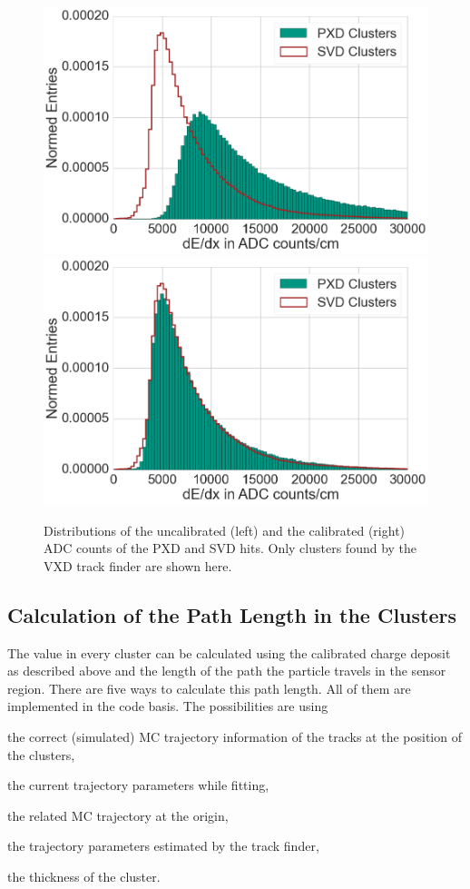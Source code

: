 \begin{figure}
  \centering
 \includegraphics[width=0.48\linewidth]{figures/vxd/dEdXUncalibrated.png}
 \includegraphics[width=0.48\linewidth]{figures/vxd/dEdXCalibrated.png}
 \caption[Distributions of the uncalibrated and the calibrated ADC counts.]{Distributions of the uncalibrated (left) and the calibrated (right) ADC counts of the PXD and SVD hits. Only clusters found by the VXD track finder are shown here.}
 \label{fig-adc-count}
\end{figure}

\subsection{Calculation of the Path Length in the Clusters} \label{subsection-calc}
The \dedx value in every cluster can be calculated using the calibrated charge deposit as described above and the length of the path the particle travels in the sensor region. There are five ways to calculate this path length. All of them are implemented in the code basis. The possibilities are using
\begin{zlist}
 \item the correct (simulated) MC trajectory information of the tracks at the position of the clusters, \label{list-mc}
 \item the current trajectory parameters while fitting,
 \item the related MC trajectory at the origin,
 \item the trajectory parameters estimated by the track finder,
 \item the thickness of the cluster.
\end{zlist}

